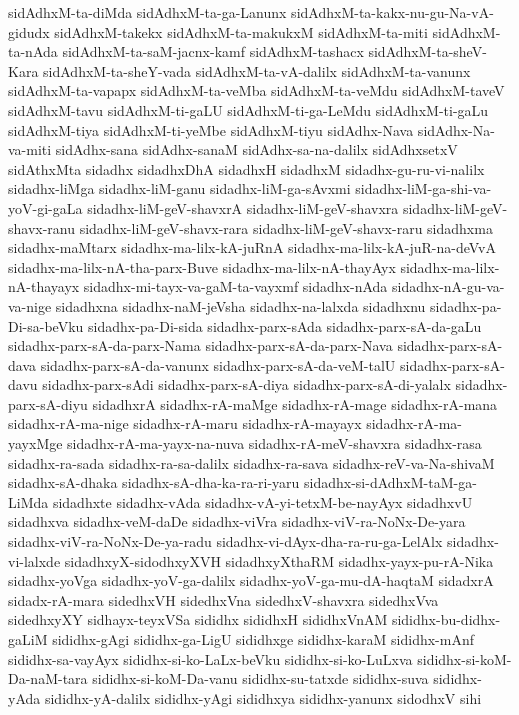{sidAdhxM-ta-diMda
sidAdhxM-ta-ga-Lanunx
sidAdhxM-ta-kakx-nu-gu-Na-vA-gidudx
sidAdhxM-takekx
sidAdhxM-ta-makukxM
sidAdhxM-ta-miti
sidAdhxM-ta-nAda
sidAdhxM-ta-saM-jacnx-kamf
sidAdhxM-tashacx
sidAdhxM-ta-sheV-Kara
sidAdhxM-ta-sheY-vada
sidAdhxM-ta-vA-dalilx
sidAdhxM-ta-vanunx
sidAdhxM-ta-vapapx
sidAdhxM-ta-veMba
sidAdhxM-ta-veMdu
sidAdhxM-taveV
sidAdhxM-tavu
sidAdhxM-ti-gaLU
sidAdhxM-ti-ga-LeMdu
sidAdhxM-ti-gaLu
sidAdhxM-tiya
sidAdhxM-ti-yeMbe
sidAdhxM-tiyu
sidAdhx-Nava
sidAdhx-Na-va-miti
sidAdhx-sana
sidAdhx-sanaM
sidAdhx-sa-na-dalilx
sidAdhxsetxV
sidAthxMta
sidadhx
sidadhxDhA
sidadhxH
sidadhxM
sidadhx-gu-ru-vi-nalilx
sidadhx-liMga
sidadhx-liM-ganu
sidadhx-liM-ga-sAvxmi
sidadhx-liM-ga-shi-va-yoV-gi-gaLa
sidadhx-liM-geV-shavxrA
sidadhx-liM-geV-shavxra
sidadhx-liM-geV-shavx-ranu
sidadhx-liM-geV-shavx-rara
sidadhx-liM-geV-shavx-raru
sidadhxma
sidadhx-maMtarx
sidadhx-ma-lilx-kA-juRnA
sidadhx-ma-lilx-kA-juR-na-deVvA
sidadhx-ma-lilx-nA-tha-parx-Buve
sidadhx-ma-lilx-nA-thayAyx
sidadhx-ma-lilx-nA-thayayx
sidadhx-mi-tayx-va-gaM-ta-vayxmf
sidadhx-nAda
sidadhx-nA-gu-va-va-nige
sidadhxna
sidadhx-naM-jeVsha
sidadhx-na-lalxda
sidadhxnu
sidadhx-pa-Di-sa-beVku
sidadhx-pa-Di-sida
sidadhx-parx-sAda
sidadhx-parx-sA-da-gaLu
sidadhx-parx-sA-da-parx-Nama
sidadhx-parx-sA-da-parx-Nava
sidadhx-parx-sA-dava
sidadhx-parx-sA-da-vanunx
sidadhx-parx-sA-da-veM-talU
sidadhx-parx-sA-davu
sidadhx-parx-sAdi
sidadhx-parx-sA-diya
sidadhx-parx-sA-di-yalalx
sidadhx-parx-sA-diyu
sidadhxrA
sidadhx-rA-maMge
sidadhx-rA-mage
sidadhx-rA-mana
sidadhx-rA-ma-nige
sidadhx-rA-maru
sidadhx-rA-mayayx
sidadhx-rA-ma-yayxMge
sidadhx-rA-ma-yayx-na-nuva
sidadhx-rA-meV-shavxra
sidadhx-rasa
sidadhx-ra-sada
sidadhx-ra-sa-dalilx
sidadhx-ra-sava
sidadhx-reV-va-Na-shivaM
sidadhx-sA-dhaka
sidadhx-sA-dha-ka-ra-ri-yaru
sidadhx-si-dAdhxM-taM-ga-LiMda
sidadhxte
sidadhx-vAda
sidadhx-vA-yi-tetxM-be-nayAyx
sidadhxvU
sidadhxva
sidadhx-veM-daDe
sidadhx-viVra
sidadhx-viV-ra-NoNx-De-yara
sidadhx-viV-ra-NoNx-De-ya-radu
sidadhx-vi-dAyx-dha-ra-ru-ga-LelAlx
sidadhx-vi-lalxde
sidadhxyX-sidodhxyXVH
sidadhxyXthaRM
sidadhx-yayx-pu-rA-Nika
sidadhx-yoVga
sidadhx-yoV-ga-dalilx
sidadhx-yoV-ga-mu-dA-haqtaM
sidadxrA
sidadx-rA-mara
sidedhxVH
sidedhxVna
sidedhxV-shavxra
sidedhxVva
sidedhxyXY
sidhayx-teyxVSa
sididhx
sididhxH
sididhxVnAM
sididhx-bu-didhx-gaLiM
sididhx-gAgi
sididhx-ga-LigU
sididhxge
sididhx-karaM
sididhx-mAnf
sididhx-sa-vayAyx
sididhx-si-ko-LaLx-beVku
sididhx-si-ko-LuLxva
sididhx-si-koM-Da-naM-tara
sididhx-si-koM-Da-vanu
sididhx-su-tatxde
sididhx-suva
sididhx-yAda
sididhx-yA-dalilx
sididhx-yAgi
sididhxya
sididhx-yanunx
sidodhxV
sihi
}
